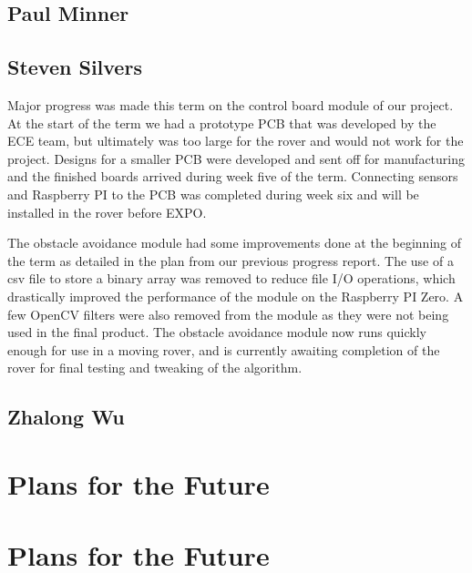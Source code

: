 \documentclass[10pt,letterpaper,onecolumn,draftclsnofoot,journal]{IEEEtran}
\begin{document}
\subsection{\textbf{Paul Minner}}


\subsection{\textbf{Steven Silvers}}
Major progress was made this term on the control board module of our project. At the start of the term we had a prototype PCB that was developed by the ECE team, but ultimately was too large for the rover and would not work for the project. Designs for a smaller PCB were developed and sent off for manufacturing and the finished boards arrived during week five of the term. Connecting sensors and Raspberry PI to the PCB was completed during week six and will be installed in the rover before EXPO.\vspace{.3cm}
\par 
The obstacle avoidance module had some improvements done at the beginning of the term as detailed in the plan from our previous progress report. The use of a csv file to store a binary array was removed to reduce file I/O operations, which drastically improved the performance of the module on the Raspberry PI Zero. A few OpenCV filters were also removed from the module as they were not being used in the final product. The obstacle avoidance module now runs quickly enough for use in a moving rover, and is currently awaiting completion of the rover for final testing and tweaking of the algorithm.

\subsection{\textbf{Zhalong Wu}}


\section{\textbf{Plans for the Future}}



\section{\textbf{Plans for the Future}}
\end{document}

